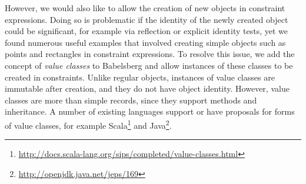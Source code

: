\documentclass[10pt,reprint]{sigplanconf-preprint}
\def\tdm#1{\todo[size=\footnotesize,color=blue!40]{\textsf{TDM: #1}}}
\def\ab#1{\todo[size=\footnotesize,color=red!40]{\textsf{AB: #1}}}
\def\tf#1{\todo[size=\footnotesize,color=purple!40]{\textsf{TF: #1}}}
\begin{document}

However, we would also like to allow the creation of new objects in 
constraint expressions.  Doing so is
problematic if the identity of the newly created object could be
significant, for example via reflection or explicit identity tests, 
yet we found numerous useful examples that involved
creating simple objects such as points and rectangles in constraint
expressions.  To resolve this issue, we add the concept of \emph{value
  classes} to Babelsberg and allow instances of these classes to be
created in constraints.  Unlike regular objects, instances of value
classes are immutable after creation,
and they
do not have object identity.
However, value classes are more than simple
records, since they support methods and inheritance.  A number of
existing languages support or have proposals for forms of value classes, for example
Scala\footnote{\url{http://docs.scala-lang.org/sips/completed/value-classes.html}}
and Java\footnote{\url{http://openjdk.java.net/jeps/169}}.
\end{document}
